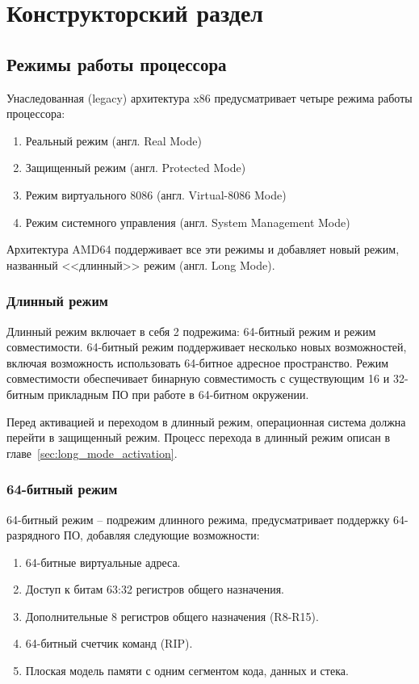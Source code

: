 \chapter{Конструкторский раздел}
\label{cha:design}

\section{Режимы работы процессора}
Унаследованная (legacy) архитектура x86 предусматривает четыре режима работы процессора:
\begin{enumerate}[1.]
	\item Реальный режим (англ. Real Mode)
	\item Защищенный режим (англ. Protected Mode)
	\item Режим виртуального 8086 (англ. Virtual-8086 Mode)
	\item Режим системного управления (англ. System Management Mode)
\end{enumerate}

Архитектура AMD64 поддерживает все эти режимы и добавляет новый режим,
названный <<длинный>> режим (англ. Long Mode).

\subsection{Длинный режим}
Длинный режим включает в себя 2 подрежима: 64-битный режим и режим совместимости.
64-битный режим поддерживает несколько новых возможностей, включая возможность
использовать 64-битное адресное пространство. Режим совместимости обеспечивает
бинарную совместимость с существующим 16 и 32-битным прикладным ПО при работе
в 64-битном окружении.

Перед активацией и переходом в длинный режим, операционная система должна перейти в
защищенный режим. Процесс перехода в длинный режим описан в главе~\ref{sec:long_mode_activation}.

\subsection{64-битный режим}
64-битный режим -- подрежим длинного режима, предусматривает поддержку 64-разрядного
ПО, добавляя следующие возможности:
\begin{enumerate}[1.]
\item 64-битные виртуальные адреса.
\item Доступ к битам 63:32 регистров общего назначения.
\item Дополнительные 8 регистров общего назначения (R8-R15).
\item 64-битный счетчик команд (RIP).
\item Плоская модель памяти с одним сегментом кода, данных и стека.
\end{enumerate}

